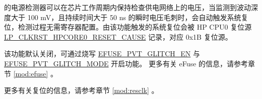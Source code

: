 \documentclass[main\_\_CN.tex]{subfiles}
\begin{document}
\chipname{} 的电源检测器可以在芯片工作周期内保持检查供电网络上的电压，当监测到波动深度大于 100 mV，且持续时间大于 50 ns 的瞬时电压毛刺时，会自动触发系统复位，检测过程无需寄存器配置。由该功能触发的系统复位会被 HP CPU0 复位源\hyperref[fielddesc:LPCLKRSTHPCORE0RESETCAUSE]{LP\_CLKRST\_HPCORE0\_RESET\_CAUSE} 记录，对应 0x1B 复位源。


该功能默认关闭，可通过烧写 \hyperref[fielddesc:EFUSEPVTGLITCHEN]{EFUSE\_PVT\_GLITCH\_EN} 与 \hyperref[fielddesc:EFUSEPVTGLITCHMODE]{EFUSE\_PVT\_GLITCH\_MODE} 开启功能。
更多有关 eFuse 的信息，请参考章节 \ref{mod:efuse} \textit{}。


更多有关复位的信息，请参考章节 \ref{mod:resclk} \textit{}。
\end{document}
